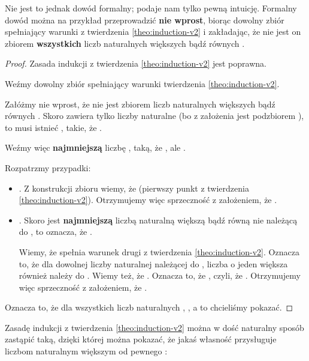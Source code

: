 Nie jest to jednak dowód formalny; podaje nam tylko pewną intuicję. Formalny dowód można na przykład przeprowadzić \textbf{nie wprost}, biorąc dowolny zbiór  spełniający warunki z twierdzenia \ref{theo:induction-v2} i zakładając, że nie jest on zbiorem \textbf{wszystkich} liczb naturalnych większych bądź równych .

\begin{proof} Zasada indukcji z twierdzenia \ref{theo:induction-v2} jest poprawna.

Weźmy dowolny zbiór  spełniający warunki twierdzenia \ref{theo:induction-v2}.

Załóżmy nie wprost, że  nie jest zbiorem liczb naturalnych większych bądź równych . Skoro  zawiera tylko liczby naturalne (bo z założenia jest podzbiorem ), to musi istnieć , takie, że .

Weźmy więc \textbf{najmniejszą} liczbę , taką, że , ale .

Rozpatrzmy przypadki:

\begin{itemize}
    \item {}. Z konstrukcji zbioru  wiemy, że  (pierwszy punkt z twierdzenia \ref{theo:induction-v2}). Otrzymujemy więc sprzeczność z założeniem, że .
    
    \item {}. Skoro  jest \textbf{najmniejszą} liczbą naturalną większą bądź równą  nie należącą do , to oznacza, że .
    
    Wiemy, że  spełnia warunek drugi z twierdzenia \ref{theo:induction-v2}. Oznacza to, że dla dowolnej liczby naturalnej należącej do , liczba o jeden większa również należy do . Wiemy też, że . Oznacza to, że , czyli, że . Otrzymujemy więc sprzeczność z założeniem, że .
\end{itemize}

Oznacza to, że dla wszystkich liczb naturalnych , , a to chcieliśmy pokazać.
\end{proof}

Zasadę indukcji z twierdzenia \ref{theo:induction-v2} można w dość naturalny sposób zastąpić taką, dzięki której można pokazać, że jakaś własność przysługuje liczbom naturalnym większym od pewnego :

